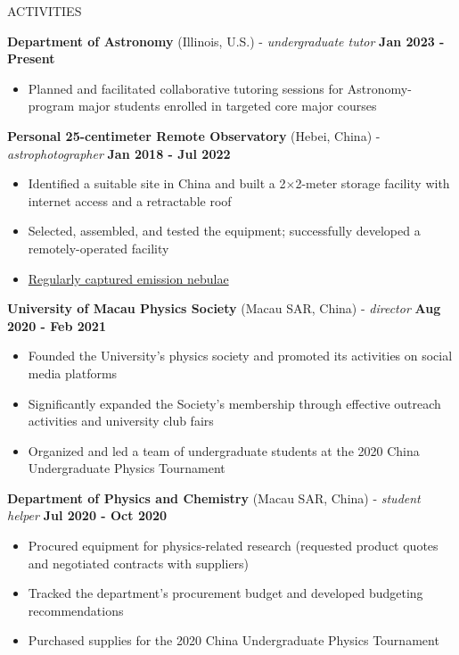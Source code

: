 \documentclass[11pt]{article}
\begin{document}
\begin{section}{ACTIVITIES}

\textbf{Department of Astronomy} (Illinois, U.S.) - \textit{undergraduate tutor} \hfill \textbf{Jan 2023 - Present}
\begin{itemize}[leftmargin=1.5em]
    \item Planned and facilitated collaborative tutoring sessions for Astronomy-program major students enrolled in targeted core major courses
\end{itemize}

\textbf{Personal 25-centimeter Remote Observatory} (Hebei, China) - \textit{astrophotographer} \hfill \textbf{Jan 2018 - Jul 2022}
\begin{itemize}[leftmargin=1.5em]
    \item Identified a suitable site in China and built a 2$\times$2-meter storage facility with internet access and a retractable roof
    \item Selected, assembled, and tested the equipment; successfully developed a remotely-operated facility
    \item \href{https://cheysen.fit/astrophotography/}{Regularly captured emission nebulae}
\end{itemize}

\textbf{University of Macau Physics Society} (Macau SAR, China) - \textit{director} \hfill \textbf{Aug 2020 - Feb 2021}
\begin{itemize}[leftmargin=1.5em]
    \item Founded the University's physics society and promoted its activities on social media platforms
    \item Significantly expanded the Society's membership through effective outreach activities and university club fairs
    \item Organized and led a team of undergraduate students at the 2020 China Undergraduate Physics Tournament%
\end{itemize}

\newpage

\textbf{Department of Physics and Chemistry} (Macau SAR, China) - \textit{student helper} \hfill \textbf{Jul 2020 - Oct 2020}
\begin{itemize}[leftmargin=1.5em]
    \item Procured equipment for physics-related research (requested product quotes and negotiated contracts with suppliers) 
    \item Tracked the department's procurement budget and developed budgeting recommendations
    \item Purchased supplies for the 2020 China Undergraduate Physics Tournament
\end{itemize}

\end{section}
\end{document}
